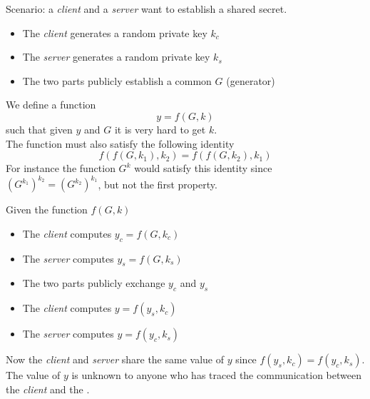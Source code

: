 \documentclass{article}
\begin{document}
Scenario: a \textit{client} and a \textit{server} want to establish a shared secret.
\begin{itemize}
	\item The \textit{client} generates a random private key \(k_c\)
	\item The \textit{server} generates a random private key \(k_s\)
	\item The two parts publicly establish a common \(G\) (generator)
\end{itemize}

We define a function
\[
	y=f(G,k)
\]
such that given \(y\) and \(G\) it is very hard to get \(k\).\\
The function must also satisfy the following identity
\[
	f(f(G, k_1), k_2)=f(f(G, k_2), k_1)
\]
For instance the function \(G^k\) would satisfy this identity since \(\left(G^{k_1}\right)^{k_2}=\left(G^{k_2}\right)^{k_1}\), but not the first property.

Given the function \(f(G,k)\)
\begin{itemize}
	\item The \textit{client} computes \(y_c=f(G,k_c)\)
	\item The \textit{server} computes \(y_s=f(G,k_s)\)
	\item The two parts publicly exchange \(y_c\) and \(y_s\)
	\item The \textit{client} computes \(y=f(y_s,k_c)\)
	\item The \textit{server} computes \(y=f(y_c,k_s)\)
\end{itemize}
Now the \textit{client} and \textit{server} share the same value of \(y\) since \(f(y_s,k_c)=f(y_c,k_s)\).\\
The value of \(y\) is unknown to anyone who has traced the communication between the \textit{client} and the .
\end{document}
